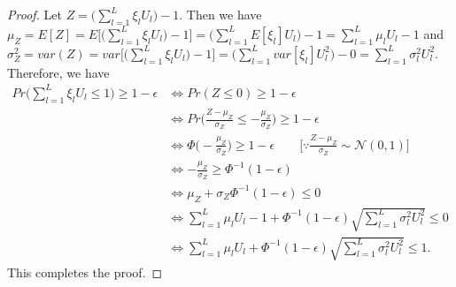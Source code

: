 \documentclass[10pt,a4paper]{amsart}
\begin{document}
\begin{proof}
	Let $Z=\bigg(\sum\limits_{l=1}^{L}\xi_lU_l\bigg)-1.$ Then we have 
	$\mu_Z=E[Z]=E\bigg[\bigg(\sum\limits_{l=1}^{L}\xi_lU_l\bigg)-1\bigg]=\bigg(\sum\limits_{l=1}^{L}E[\xi_l]U_l\bigg)-1=\sum\limits_{l=1}^{L}\mu_lU_l-1$ and $\sigma_Z^2=var(Z)=var\bigg[\bigg(\sum\limits_{l=1}^{L}\xi_lU_l\bigg)-1\bigg]=\bigg(\sum\limits_{l=1}^{L}var[\xi_l]U_l^2\bigg)-0=\sum\limits_{l=1}^{L}\sigma_l^2U_l^2.$ Therefore, we have 
	\begin{equation*}
		\begin{aligned}
		Pr\bigg(\sum\limits_{l=1}^{L}\xi_lU_l\le 1\bigg)\ge 1-\epsilon
		 & \Leftrightarrow Pr(Z\le 0)\ge 1-\epsilon\\
	    & \Leftrightarrow Pr\bigg(\frac{Z-\mu_Z}{\sigma_Z}\le -\frac{\mu_Z}{\sigma_Z}\bigg)\ge 1-\epsilon\\
	    & \Leftrightarrow \Phi\bigg(-\frac{\mu_Z}{\sigma_Z}\bigg)\ge 1-\epsilon \qquad \bigg[\because \frac{Z-\mu_Z}{\sigma_Z}\sim \mathcal{N}(0,1)\bigg]\\ 
	    & \Leftrightarrow -\frac{\mu_Z}{\sigma_Z}\ge \Phi^{-1}(1-\epsilon)\\
	    & \Leftrightarrow \mu_Z+\sigma_Z \Phi^{-1}(1-\epsilon)\le0\\
	    & \Leftrightarrow \sum\limits_{l=1}^{L}\mu_lU_l-1+\Phi^{-1}(1-\epsilon)\sqrt{\sum\limits_{l=1}^{L}\sigma_l^2U_l^2}\le0\\
	    & \Leftrightarrow \sum\limits_{l=1}^{L}\mu_lU_l+\Phi^{-1}(1-\epsilon)\sqrt{\sum\limits_{l=1}^{L}\sigma_l^2U_l^2}\le1.
		\end{aligned}
	\end{equation*}
This completes the proof.
\end{proof}
\end{document}
